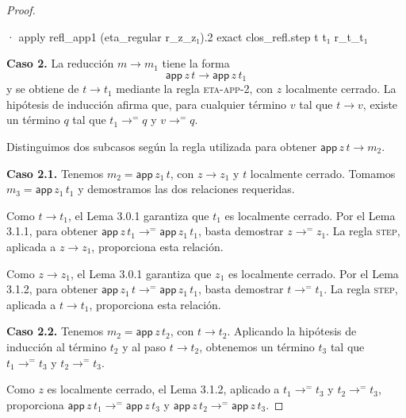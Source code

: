 \documentclass[
  spanish,
  letterpaper,
  DIV=11,
  numbers=noendperiod]{scrreprt}
\newenvironment{Shaded}{\begin{snugshade}}{\end{snugshade}}
\newcommand{\KeywordTok}[1]{\textcolor[rgb]{0.00,0.23,0.31}{\textbf{#1}}}
\newcommand{\NormalTok}[1]{\textcolor[rgb]{0.00,0.23,0.31}{#1}}
\renewcommand{\NormalTok}[1]{\textcolor[HTML]{000000}{#1}}
\renewcommand{\KeywordTok}[1]{\textcolor[HTML]{0000FF}{#1}}
\theoremstyle{remark}
\begin{document}
\begin{proof}
\begin{Shaded}
\begin{Highlighting}[]
\NormalTok{      · }\KeywordTok{apply}\NormalTok{ refl\_app1 (eta\_regular r\_z\_z₁).2}
        \KeywordTok{exact}\NormalTok{ clos\_refl.step t t₁ r\_t\_t₁}
\end{Highlighting}
\end{Shaded}

\textbf{Caso 2.} La reducción \(m\longrightarrow m_1\) tiene la forma \[
\mathsf{app}\,z\,t \longrightarrow \mathsf{app}\,z\,t_1
\] y se obtiene de \(t\longrightarrow t_1\) mediante la regla
\textsc{eta-app-2}, con \(z\) localmente cerrado. La hipótesis de
inducción afirma que, para cualquier término \(v\) tal que
\(t\longrightarrow v\), existe un término \(q\) tal que
\(t_1\longrightarrow^{=}q\) y \(v\longrightarrow^{=}q\).

Distinguimos dos subcasos según la regla utilizada para obtener
\(\mathsf{app}\,z\,t\longrightarrow m_2\).

\textbf{Caso 2.1.} Tenemos \(m_2=\mathsf{app} \, z_1 \, t\), con
\(z\longrightarrow z_1\) y \(t\) localmente cerrado. Tomamos
\(m_3=\mathsf{app} \, z_1 \, t_1\) y demostramos las dos relaciones
requeridas.

Como \(t\longrightarrow t_1\), el Lema 3.0.1 garantiza que \(t_1\) es
localmente cerrado. Por el Lema 3.1.1, para obtener
\(\mathsf{app} \, z \, t_1\longrightarrow^{=} \mathsf{app} \, z_1 \, t_1\),
basta demostrar \(z\longrightarrow^{=}z_1\). La regla \textsc{step},
aplicada a \(z\longrightarrow z_1\), proporciona esta relación.

Como \(z\longrightarrow z_1\), el Lema 3.0.1 garantiza que \(z_1\) es
localmente cerrado. Por el Lema 3.1.2, para obtener
\(\mathsf{app} \, z_1 \, t\longrightarrow^{=} \mathsf{app} \, z_1 \, t_1\),
basta demostrar \(t\longrightarrow^{=}t_1\). La regla \textsc{step},
aplicada a \(t\longrightarrow t_1\), proporciona esta relación.

\textbf{Caso 2.2.} Tenemos \(m_2=\mathsf{app}\,z\,t_2\), con
\(t\longrightarrow t_2\). Aplicando la hipótesis de inducción al término
\(t_2\) y al paso \(t\longrightarrow t_2\), obtenemos un término \(t_3\)
tal que \(t_1\longrightarrow^{=}t_3\) y \(t_2\longrightarrow^{=}t_3\).

Como \(z\) es localmente cerrado, el Lema 3.1.2, aplicado a
\(t_1\longrightarrow^{=}t_3\) y \(t_2\longrightarrow^{=}t_3\),
proporciona
\(\mathsf{app}\,z\,t_1\longrightarrow^{=}\mathsf{app}\,z\,t_3\) y
\(\mathsf{app}\,z\,t_2\longrightarrow^{=}\mathsf{app}\,z\,t_3\).


\end{proof}
\end{document}

